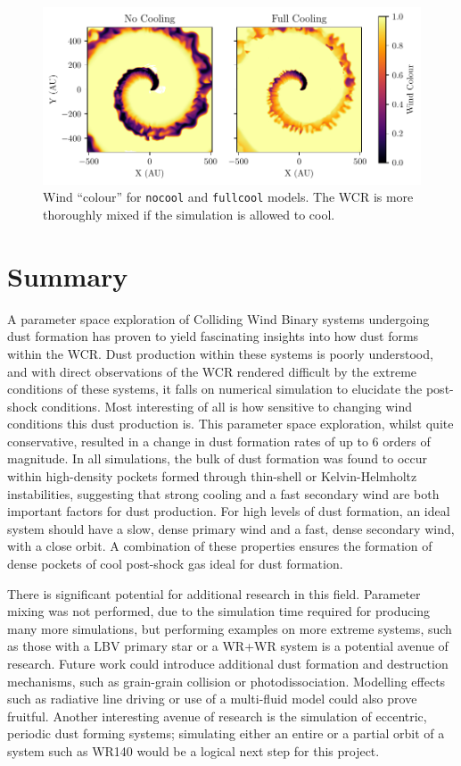 \begin{figure}
  \centering
  \includegraphics{assets/results/radiative/radiative-r0.pdf}
  \caption[Wind mixing due to radiative methods]{Wind ``colour'' for \texttt{nocool} and \texttt{fullcool} models. The WCR is more thoroughly mixed if the simulation is allowed to cool.}
  \label{fig:radiative-windmixing}
\end{figure}

\section{Summary}

A parameter space exploration of Colliding Wind Binary systems undergoing dust formation has proven to yield fascinating insights into how dust forms within the WCR.
Dust production within these systems is poorly understood, and with direct observations of the WCR rendered difficult by the extreme conditions of these systems, it falls on numerical simulation to elucidate the post-shock conditions.
Most interesting of all is how sensitive to changing wind conditions this dust production is.
This parameter space exploration, whilst quite conservative, resulted in a change in dust formation rates of up to 6 orders of magnitude.
In all simulations, the bulk of dust formation was found to occur within high-density pockets formed through thin-shell or Kelvin-Helmholtz instabilities, suggesting that strong cooling and a fast secondary wind are both important factors for dust production.
For high levels of dust formation, an ideal system should have a slow, dense primary wind and a fast, dense secondary wind, with a close orbit.
A combination of these properties ensures the formation of dense pockets of cool post-shock gas ideal for dust formation.

There is significant potential for additional research in this field.
Parameter mixing was not performed, due to the simulation time required for producing many more simulations, but performing examples on more extreme systems, such as those with a LBV primary star or a WR+WR system is a potential avenue of research.
Future work could introduce additional dust formation and destruction mechanisms, such as grain-grain collision or photodissociation.
Modelling effects such as radiative line driving or use of a multi-fluid model could also prove fruitful. 
Another interesting avenue of research is the simulation of eccentric, periodic dust forming systems; simulating either an entire or a partial orbit of a system such as WR140 would be a logical next step for this project.

